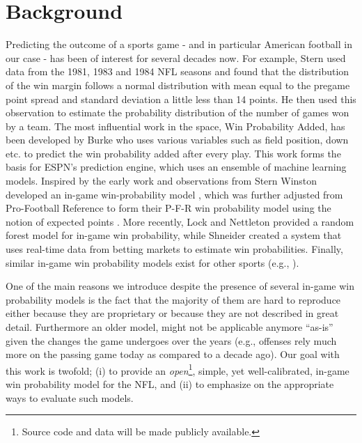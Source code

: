 \section{Background}
\label{sec:background}

Predicting the outcome of a sports game - and in particular American football in our case - has been of interest for several decades now. 
For example, Stern \cite{stern91} used data from the 1981, 1983 and 1984 NFL seasons and found that the distribution of the win margin follows a normal distribution with mean equal to the pregame point spread and standard deviation a little less than 14 points.  
He then used this observation to estimate the probability distribution of the number of games won by a team.  
The most influential work in the space, Win Probability Added, has been developed by Burke \cite{wpa} who uses various variables such as field position, down etc. to predict the win probability added after every play.  
This work forms the basis for ESPN's prediction engine, which uses an ensemble of machine learning models.   
Inspired by the early work and observations from Stern Winston developed an in-game win-probability model \cite{winston2012mathletics}, which was further adjusted from Pro-Football Reference to form their P-F-R win probability model using the notion of expected points \cite{pfrmodel}.  
More recently, Lock and Nettleton \cite{lock2014using} provided a random forest model for in-game win probability, while Shneider \cite{gambletron} created a system that uses real-time data from betting markets to estimate win probabilities. 
Finally, similar in-game win probability models exist for other sports (e.g., \cite{buttrey2011estimating,stern1994brownian}). 

One of the main reasons we introduce {\method} despite the presence of several in-game win probability models is the fact that the majority of them are hard to reproduce either because they are proprietary or because they are not described in great detail.  
Furthermore an older model, might not be applicable anymore ``as-is'' given the changes the game undergoes over the years (e.g., offenses rely much more on the passing game today as compared to a decade ago). 
Our goal with this work is twofold; (i) to provide an {\em open}\footnote{Source code and data will be made publicly available.}, simple, yet well-calibrated, in-game win probability model for the NFL, and (ii) to emphasize on the appropriate ways to evaluate such models. 
